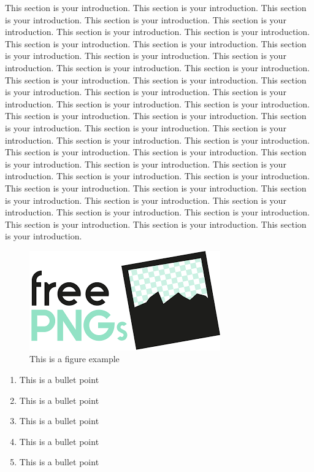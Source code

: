 
{
\begin{doublespacing}
\begin{flushleft}

This section is your introduction. 
This section is your introduction. 
This section is your introduction. 
This section is your introduction. 
This section is your introduction. 
This section is your introduction. 
This section is your introduction. 
This section is your introduction. 
This section is your introduction. 
This section is your introduction. 
This section is your introduction. 
This section is your introduction. 
This section is your introduction. 
This section is your introduction. 
This section is your introduction. 
This section is your introduction. 
This section is your introduction. 
This section is your introduction. 
This section is your introduction. 
This section is your introduction. 
This section is your introduction. 
This section is your introduction. 
This section is your introduction. 
This section is your introduction. 
This section is your introduction. 
This section is your introduction. 
This section is your introduction. 
This section is your introduction. 
This section is your introduction. 
This section is your introduction. 
This section is your introduction. 
This section is your introduction. 
This section is your introduction. 
This section is your introduction. 
This section is your introduction. 
This section is your introduction. 
This section is your introduction. 
This section is your introduction. 
This section is your introduction. 
This section is your introduction. 
This section is your introduction. 
This section is your introduction. 
This section is your introduction. 
This section is your introduction. 
This section is your introduction. 


\begin{figure}[!htb]
\centering
\includegraphics[scale=0.6]{Image/fig_example.PNG}
\caption{This is a figure example}
\label{fig: fig_example}
\end{figure}



\begin{enumerate}
    \item This is a bullet point
    \item This is a bullet point
    \item This is a bullet point
    \item This is a bullet point
    \item This is a bullet point
\end{enumerate}

\end{flushleft}
\end{doublespacing}
}